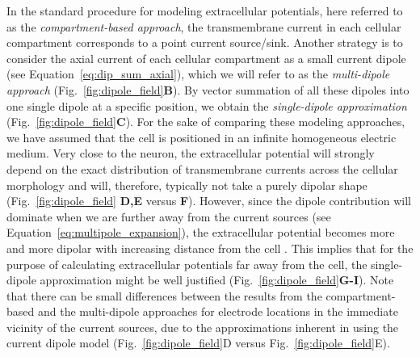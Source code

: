 \documentclass[preprint,10pt,authoryear]{elsarticle}
\newcommand{\hlb}[2][NavyBlue]{ {\sethlcolor{#1} \hl{#2}} }
\newcommand{\hlg}[2][Emerald]{ {\sethlcolor{#1} \hl{#2}} }
\newcommand{\snnote}[1]{\color{white}{\hlb{SN: #1 }}\color{black}}
\newcommand{\tvnnote}[1]{\color{white}{\hlg{TVN: #1 }}\color{black}}
\begin{document}
In the standard procedure for modeling extracellular potentials, here referred to as the {\it compartment-based approach}, the transmembrane current in each cellular compartment corresponds to a point current source/sink. Another strategy is to consider the axial current of each cellular compartment as a small current dipole (see Equation~\eqref{eq:dip_sum_axial}), which we will refer to as the {\it multi-dipole approach} (Fig.~\ref{fig:dipole_field}\textbf{B}). By vector summation of all these dipoles into one single dipole at a specific position, we obtain the {\it single-dipole approximation} (Fig.~\ref{fig:dipole_field}\textbf{C}).
For the sake of comparing these modeling approaches, we have assumed that the cell is positioned in an infinite homogeneous electric medium. Very close to the neuron, the extracellular potential will strongly depend on the exact distribution of transmembrane currents across the cellular morphology and  will, therefore, typically not take a purely dipolar shape (Fig.~\ref{fig:dipole_field} \textbf{D,E} versus \textbf{F}). However, since the dipole contribution will dominate when we are further away from the current sources (see Equation~\ref{eq:multipole_expansion}), the extracellular potential becomes more and more dipolar with increasing distance from the cell \citep{LINDEN2010}. This implies that for the purpose of calculating extracellular potentials far away from the cell, the single-dipole approximation might be well justified (Fig.~\ref{fig:dipole_field}\textbf{G-I}). Note that there can be small differences between the results from the compartment-based and the multi-dipole approaches for electrode locations in the immediate vicinity of the current sources, due to the approximations inherent in using the current dipole model (Fig.~\ref{fig:dipole_field}D versus Fig.~\ref{fig:dipole_field}E).


\end{document}
